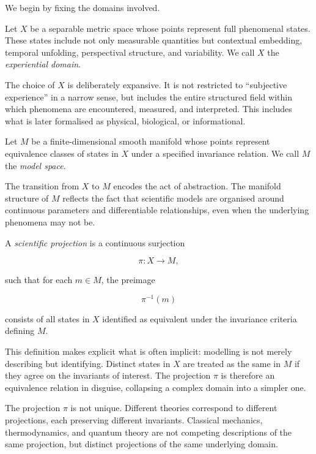 \documentclass[11pt,openany]{book}
\begin{document}
We begin by fixing the domains involved.

\begin{definition}
Let $X$ be a separable metric space whose points represent full phenomenal states. These states include not only measurable quantities but contextual embedding, temporal unfolding, perspectival structure, and variability. We call $X$ the \emph{experiential domain}.
\end{definition}

The choice of $X$ is deliberately expansive. It is not restricted to “subjective experience” in a narrow sense, but includes the entire structured field within which phenomena are encountered, measured, and interpreted. This includes what is later formalised as physical, biological, or informational.

\begin{definition}
Let $M$ be a finite-dimensional smooth manifold whose points represent equivalence classes of states in $X$ under a specified invariance relation. We call $M$ the \emph{model space}.
\end{definition}

The transition from $X$ to $M$ encodes the act of abstraction. The manifold structure of $M$ reflects the fact that scientific models are organised around continuous parameters and differentiable relationships, even when the underlying phenomena may not be.

\begin{definition}[Projection]
A \emph{scientific projection} is a continuous surjection

$$
\pi : X \to M,
$$

such that for each $m \in M$, the preimage

$$
\pi^{-1}(m)
$$

consists of all states in $X$ identified as equivalent under the invariance criteria defining $M$.
\end{definition}

This definition makes explicit what is often implicit: modelling is not merely describing but identifying. Distinct states in $X$ are treated as the same in $M$ if they agree on the invariants of interest. The projection $\pi$ is therefore an equivalence relation in disguise, collapsing a complex domain into a simpler one.

\begin{remark}
The projection $\pi$ is not unique. Different theories correspond to different projections, each preserving different invariants. Classical mechanics, thermodynamics, and quantum theory are not competing descriptions of the same projection, but distinct projections of the same underlying domain.
\end{remark}
\end{document}
